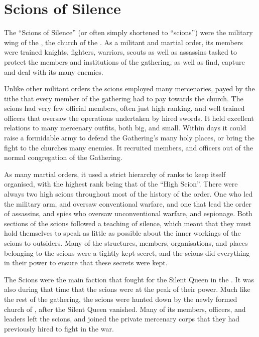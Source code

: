 \section{Scions of Silence}
\label{sec:Scions of Silence}

The ``Scions of Silence'' (or often simply shortened to ``scions'') were the
military wing of the , the church of the
. As a militant and martial order, its members were
trained knights, fighters, warriors, scouts as well as assassins tasked to
protect the members and institutions of the gathering, as well as find,
capture and deal with its many enemies.

Unlike other militant orders the scions employed many mercenaries, payed by
the tithe that every member of the gathering had to pay towards the church.
The scions had very few official members, often just high ranking, and well
trained officers that oversaw the operations undertaken by hired swords. It
held excellent relations to many mercenary outfits, both big, and
small. Within days it could raise a formidable army to defend the Gathering's
many holy places, or bring the fight to the churches many enemies. It
recruited members, and officers out of the normal congregation of the
Gathering.

As many martial orders, it used a strict hierarchy of ranks to keep itself
organised, with the highest rank being that of the ``High Scion''. There were
always two high scions throughout most of the history of the order. One who
led the military arm, and oversaw conventional warfare, and one that lead the
order of assassins, and spies who oversaw unconventional warfare, and
espionage. Both sections of the scions followed a teaching of silence, which
meant that they must hold themselves to speak as little as possible about the
inner workings of the scions to outsiders. Many of the structures, members,
organisations, and places belonging to the scions were a tightly kept secret,
and the scions did everything in their power to ensure that these secrets were
kept.

The Scions were the main faction that fought for the Silent Queen in the
. It was also during that time that the scions were
at the peak of their power. Much like the rest of the gathering, the scions
were hunted down by the newly formed church of , after the
Silent Queen vanished. Many of its members, officers, and leaders left the
scions, and joined the private mercenary corps that they had previously hired
to fight in the war.

